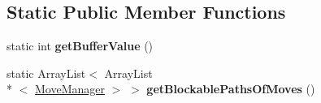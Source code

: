 \subsection*{Static Public Member Functions}
\begin{DoxyCompactItemize}
\item 
\hypertarget{enumenums_1_1_level_one_legal_moves_a2e063e3043d2e10d5b5f955672cfb13a}{static int {\bfseries get\-Buffer\-Value} ()}\label{enumenums_1_1_level_one_legal_moves_a2e063e3043d2e10d5b5f955672cfb13a}

\item 
\hypertarget{enumenums_1_1_level_one_legal_moves_a34d8b13bfd5cde344ec50cb8e0ab7cb8}{static Array\-List$<$ Array\-List\\*
$<$ \hyperlink{interfaceinterfaces_1_1_move_manager}{Move\-Manager} $>$ $>$ {\bfseries get\-Blockable\-Paths\-Of\-Moves} ()}\label{enumenums_1_1_level_one_legal_moves_a34d8b13bfd5cde344ec50cb8e0ab7cb8}

\end{DoxyCompactItemize}
